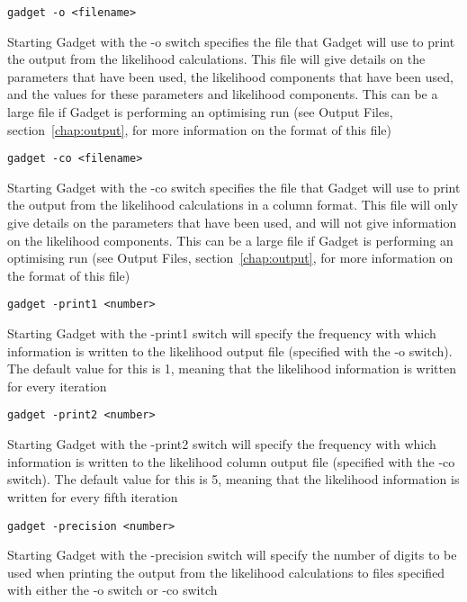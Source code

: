 \documentclass [a4paper, 10pt]{book}
\begin{document}
{\small\begin{verbatim}
gadget -o <filename>
\end{verbatim}}
Starting Gadget with the -o switch specifies the file that Gadget will use to print the output from the likelihood calculations.  This file will give details on the parameters that have been used, the likelihood components that have been used, and the values for these parameters and likelihood components.  This can be a large file if Gadget is performing an optimising run (see Output Files, section~\ref{chap:output}, for more information on the format of this file)

\newpage
{\small\begin{verbatim}
gadget -co <filename>
\end{verbatim}}
Starting Gadget with the -co switch specifies the file that Gadget will use to print the output from the likelihood calculations in a column format.  This file will only give details on the parameters that have been used, and will not give information on the likelihood components.  This can be a large file if Gadget is performing an optimising run (see Output Files, section~\ref{chap:output}, for more information on the format of this file)

{\small\begin{verbatim}
gadget -print1 <number>
\end{verbatim}}
Starting Gadget with the -print1 switch will specify the frequency with which information is written to the likelihood output file (specified with the -o switch).  The default value for this is 1, meaning that the likelihood information is written for every iteration

{\small\begin{verbatim}
gadget -print2 <number>
\end{verbatim}}
Starting Gadget with the -print2 switch will specify the frequency with which information is written to the likelihood column output file (specified with the -co switch).  The default value for this is 5, meaning that the likelihood information is written for every fifth iteration

{\small\begin{verbatim}
gadget -precision <number>
\end{verbatim}}
Starting Gadget with the -precision switch will specify the number of digits to be used when printing the output from the likelihood calculations to files specified with either the -o switch or -co switch
\end{document}
